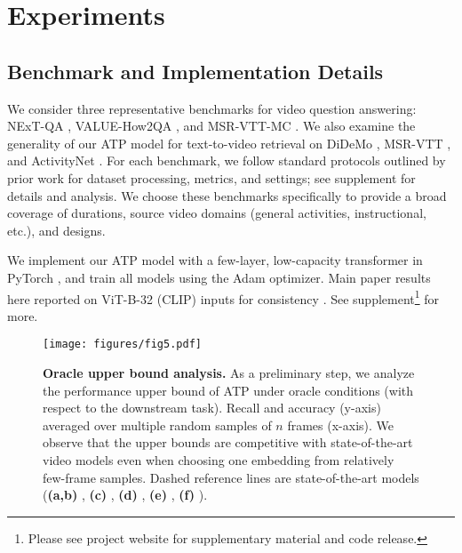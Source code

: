 
\section{Experiments}
\label{sec:experiments}

\subsection{Benchmark and Implementation Details}
\label{sec:exp:bench-implem}

 We consider three representative benchmarks for video question answering: NExT-QA \cite{xiao2021next}, VALUE-How2QA \cite{li2021value,li2020hero}, and MSR-VTT-MC \cite{xu2016msr}. We also examine the generality of our ATP model for text-to-video retrieval on DiDeMo \cite{hendricks2018localizing}, MSR-VTT \cite{xu2016msr}, and ActivityNet \cite{krishna2017dense}. For each benchmark, we follow standard protocols outlined by prior work \cite{lei2021less,xu2021videoclip,xiao2021next,li2021value} for dataset processing, metrics, and settings; see supplement for details and analysis. We choose these benchmarks specifically to provide a broad coverage of durations, source video domains (general activities, instructional, etc.), and designs. 

 We implement our ATP model with a few-layer, low-capacity transformer \cite{vaswani2017attention} in PyTorch \cite{paszke2019pytorch}, and train all models using the Adam \cite{kingma2014adam} optimizer. Main paper results here reported on ViT-B-32 (CLIP) inputs for consistency \cite{radford2018improving,dosovitskiy2020image,li2021value}.
See supplement\footnote{Please see project website for supplementary material and code release.}
for more.

\begin{figure}[t]
\begin{center}
\centerline{\texttt{[image: figures/fig5.pdf]}}
\vskip -0.1in
\caption{\textbf{Oracle upper bound analysis.} As a preliminary step, we analyze the performance upper bound of ATP under oracle conditions (with respect to the downstream task). Recall and accuracy (y-axis) averaged over multiple random samples of $n$ frames (x-axis). We observe that the upper bounds are competitive with state-of-the-art video models even when choosing one embedding from relatively few-frame samples. Dashed reference lines are state-of-the-art models (\textbf{(a,b)} \cite{xu2021videoclip}, \textbf{(c)} \cite{li2021value}, \textbf{(d)} \cite{bain2021frozen}, \textbf{(e)} \cite{xiao2021next}, \textbf{(f)} \cite{lei2021less}).
}
\label{fig:exp-oracle-analysis}
\end{center}
\vskip -0.2in
\end{figure}

